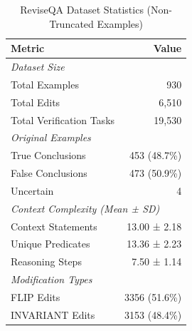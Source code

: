 \begin{table}[t]
\centering
\caption{ReviseQA Dataset Statistics (Non-Truncated Examples)}
\label{tab:dataset_stats}
\begin{tabular}{lr}
\toprule
\textbf{Metric} & \textbf{Value} \\
\midrule
\multicolumn{2}{l}{\textit{Dataset Size}} \\
Total Examples & 930 \\
Total Edits & 6,510 \\
Total Verification Tasks & 19,530 \\
\midrule
\multicolumn{2}{l}{\textit{Original Examples}} \\
True Conclusions & 453 (48.7\%) \\
False Conclusions & 473 (50.9\%) \\
Uncertain & 4 \\
\midrule
\multicolumn{2}{l}{\textit{Context Complexity (Mean ± SD)}} \\
Context Statements & 13.00 ± 2.18 \\
Unique Predicates & 13.36 ± 2.23 \\
Reasoning Steps & 7.50 ± 1.14 \\
\midrule
\multicolumn{2}{l}{\textit{Modification Types}} \\
FLIP Edits & 3356 (51.6\%) \\
INVARIANT Edits & 3153 (48.4\%) \\
\bottomrule
\end{tabular}
\end{table}
